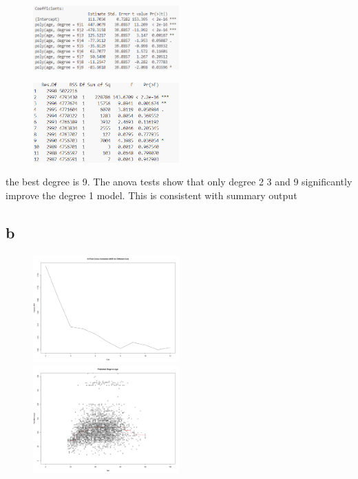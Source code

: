 \documentclass{article}
\begin{document}
\begin{figure}[h]
    \centering
    \includegraphics[width=0.5\textwidth]{figs/q6-a3.png}
    \caption{}
    \label{fig: summary}
\end{figure}

\begin{figure}[h]
    \centering
    \includegraphics[width=0.5\textwidth]{figs/q6-a4.png}
    \caption{}
    \label{fig: anova}
\end{figure}

\newpage
the best degree is 9.
The anova tests show that only degree 2 3 and 9 significantly improve the degree 1 model.
This is consistent with summary output

\newpage
\subsection*{b}
\begin{figure}[h]
    \centering
    \includegraphics[width=0.5\textwidth]{figs/q6-b1.png}
    \includegraphics[width=0.5\textwidth]{figs/q6-b2.png}
    \caption{}
    \label{fig: b2 plots}
\end{figure}
\end{document}
